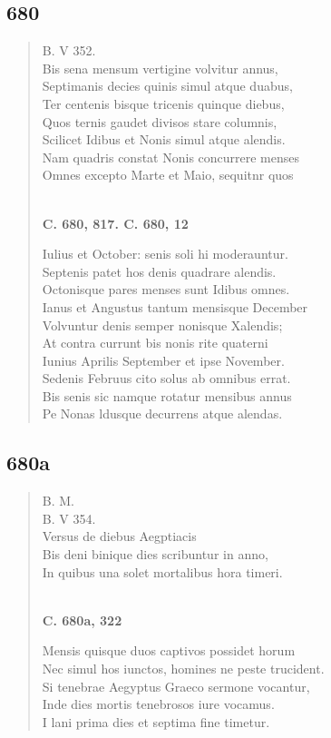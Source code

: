 \documentclass[11pt, a4paper]{report}
\begin{document}
            \subsection*{680}
      \begin{verse}
      B. V 352. \\ Bis sena mensum vertigine volvitur annus, \\ Septimanis decies quinis simul atque duabus, \\ Ter centenis bisque tricenis quinque diebus, \\ Quos ternis gaudet divisos stare columnis, \\ Scilicet Idibus et Nonis simul atque alendis. \\ Nam quadris constat Nonis concurrere menses \\ Omnes excepto Marte et Maio, sequitnr quos \\ 
        ﻿\pagebreak 
     \marginpar{[156]} \begin{center} \textbf{C. 680, 817. C. 680, 12} \end{center}Iulius et October: senis soli hi moderauntur. \\ Septenis patet hos denis quadrare alendis. \\ Octonisque pares menses sunt Idibus omnes. \\ Ianus et Angustus tantum mensisque December \\ Volvuntur denis semper nonisque Xalendis; \\ At contra currunt bis nonis rite quaterni \\ Iunius Aprilis September et ipse November. \\ Sedenis Februus cito solus ab omnibus errat. \\ Bis senis sic namque rotatur mensibus annus \\ Pe Nonas ldusque decurrens atque alendas. \\ 
      \end{verse}
  
            \subsection*{680a}
      \begin{verse}
      B. M. \\ B. V 354. \\ Versus de diebus Aegptiacis \\ Bis deni binique dies scribuntur in anno, \\ In quibus una solet mortalibus hora timeri. \\ 
        ﻿\pagebreak 
    \begin{center} \textbf{C. 680a, 322} \end{center} \marginpar{[157]} Mensis quisque duos captivos possidet horum \\ Nec simul hos iunctos, homines ne peste trucident. \\ Si tenebrae Aegyptus Graeco sermone vocantur, \\ Inde dies mortis tenebrosos iure vocamus. \\ I lani prima dies et septima fine timetur. \\ 
      \end{verse}
  
\end{document}
